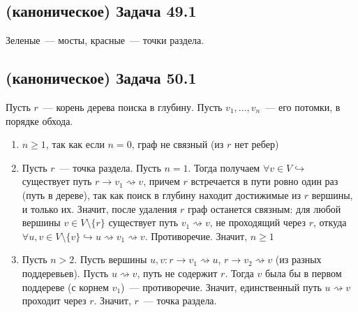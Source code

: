 \documentclass[a4paper]{article}
\begin{document}
\subsection*{(каноническое) Задача 49.1}
Зеленые~--- мосты, красные~--- точки раздела.\newline
{}
\subsection*{(каноническое) Задача 50.1}
Пусть $r$~--- корень дерева поиска в глубину. Пусть $v_1,...,v_n$~--- его потомки, в порядке обхода.\begin{enumerate}
\item $n\geqslant 1$, так как если $n=0$, граф не связный (из $r$ нет ребер)
\item Пусть $r$~--- точка раздела. Пусть $n=1$. Тогда получаем $\forall v\in V\hookrightarrow$ существует путь $r\to v_1\rightsquigarrow v$, причем $r$ встречается в пути ровно один раз (путь в дереве), так как поиск в глубину находит достижимые из $r$ вершины, и только их. Значит, после удаления $r$ граф останется связным: для любой вершины $v\in V\setminus \{r\}$ существует путь $v_1\rightsquigarrow v$, не проходящий через $r$, откуда $\forall u,v\in V\setminus\{v\}\hookrightarrow u\rightsquigarrow v_1\rightsquigarrow v$. Противоречие. Значит, $n\geqslant 1$
\item Пусть $n>2$. Пусть вершины $u,v\colon r\to v_1\rightsquigarrow u$, $r\to v_2\rightsquigarrow v$ (из разных поддеревьев). Пусть $u\rightsquigarrow v$, путь не содержит $r$. Тогда $v$ была бы в первом поддереве (с корнем $v_1$)~--- противоречие. Значит, единственный путь $u\rightsquigarrow v$ проходит через $r$. Значит, $r$~--- точка раздела.
\end{enumerate}
\end{document}
